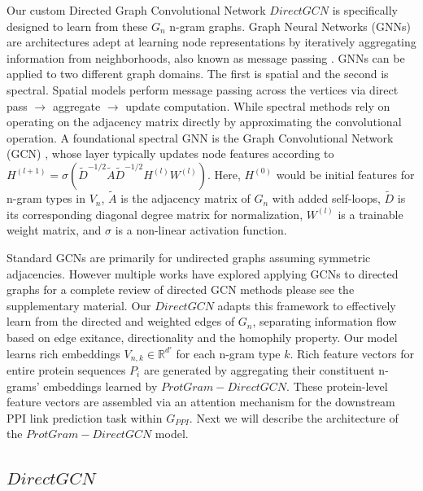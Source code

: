 \documentclass[utf8]{FrontiersinHarvard}
\begin{document}
	Our custom Directed Graph Convolutional Network $DirectGCN$ is specifically designed to learn from these $G_{n}$ n-gram graphs. Graph Neural Networks (GNNs) are architectures adept at learning node representations by iteratively aggregating information from neighborhoods, also known as message passing \cite{scarselli_graphneuralnetwork_2009}. GNNs can be applied to two different graph domains. The first is spatial and the second is spectral. Spatial models perform message passing across the vertices via direct pass $\rightarrow$ aggregate $\rightarrow$ update computation. While spectral methods rely on operating on the adjacency matrix directly by approximating the convolutional operation. A foundational spectral GNN is the Graph Convolutional Network (GCN) \cite{kipf_semisupervisedclassificationgraph_2017}, whose layer typically updates node features according to $H^{(l+1)} = \sigma\left(\tilde{D}^{-1/2} \tilde{A} \tilde{D}^{-1/2} H^{(l)} W^{(l)}\right)$. Here, $H^{(0)}$ would be initial features for n-gram types in $V_{n}$, $\tilde{A}$ is the adjacency matrix of $G_{n}$ with added self-loops, $\tilde{D}$ is its corresponding diagonal degree matrix for normalization, $W^{(l)}$ is a trainable weight matrix, and $\sigma$ is a non-linear activation function.
	
	Standard GCNs are primarily for undirected graphs assuming symmetric adjacencies. However multiple works have explored applying GCNs to directed graphs for a complete review of directed GCN methods please see the supplementary material. Our $DirectGCN$ adapts this framework to effectively learn from the directed and weighted edges of $G_{n}$, separating information flow based on edge exitance, directionality and the homophily property. Our model learns rich embeddings $V_{n,k} \in \mathbb{R}^{d'}$ for each n-gram type $k$. Rich feature vectors for entire protein sequences $P_i$ are generated by aggregating their constituent n-grams' embeddings learned by $ProtGram-DirectGCN$. These protein-level feature vectors are assembled via an attention mechanism for the downstream PPI link prediction task within $G_{PPI}$. Next we will describe the architecture of the $ProtGram-DirectGCN$ model.
	
	\subsection{$DirectGCN$}
\end{document}
